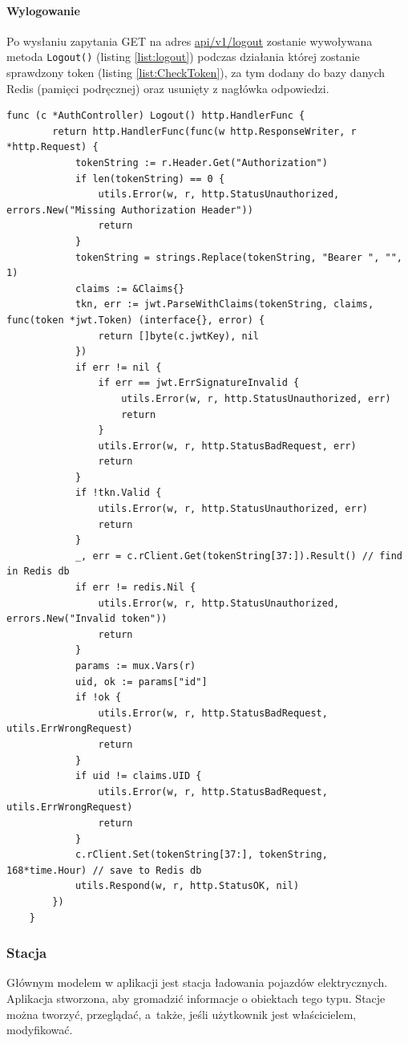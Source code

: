 \paragraph{Wylogowanie\newline}
Po wysłaniu zapytania GET na adres \url{api/v1/logout} zostanie wywoływana metoda \texttt{Logout()} (listing \ref{list:logout}) podczas działania której zostanie sprawdzony token (listing \ref{list:CheckToken}), za tym dodany do bazy danych Redis (pamięci podręcznej) oraz usunięty z nagłówka odpowiedzi.
\begin{lstlisting}[label=list:logout,caption=Wylogowanie,basicstyle=\tiny\ttfamily]
    func (c *AuthController) Logout() http.HandlerFunc {
        return http.HandlerFunc(func(w http.ResponseWriter, r *http.Request) {
            tokenString := r.Header.Get("Authorization")
            if len(tokenString) == 0 {
                utils.Error(w, r, http.StatusUnauthorized, errors.New("Missing Authorization Header"))
                return
            }
            tokenString = strings.Replace(tokenString, "Bearer ", "", 1)
            claims := &Claims{}
            tkn, err := jwt.ParseWithClaims(tokenString, claims, func(token *jwt.Token) (interface{}, error) {
                return []byte(c.jwtKey), nil
            })
            if err != nil {
                if err == jwt.ErrSignatureInvalid {
                    utils.Error(w, r, http.StatusUnauthorized, err)
                    return
                }
                utils.Error(w, r, http.StatusBadRequest, err)
                return
            }
            if !tkn.Valid {
                utils.Error(w, r, http.StatusUnauthorized, err)
                return
            }
            _, err = c.rClient.Get(tokenString[37:]).Result() // find in Redis db
            if err != redis.Nil {
                utils.Error(w, r, http.StatusUnauthorized, errors.New("Invalid token"))
                return
            }
            params := mux.Vars(r)
            uid, ok := params["id"]
            if !ok {
                utils.Error(w, r, http.StatusBadRequest, utils.ErrWrongRequest)
                return
            }
            if uid != claims.UID {
                utils.Error(w, r, http.StatusBadRequest, utils.ErrWrongRequest)
                return
            }
            c.rClient.Set(tokenString[37:], tokenString, 168*time.Hour) // save to Redis db
            utils.Respond(w, r, http.StatusOK, nil)
        })
    }
\end{lstlisting}

\subsubsection{Stacja}
Głównym modelem w aplikacji jest stacja ładowania pojazdów elektrycznych. Aplikacja stworzona, aby gromadzić informacje o obiektach tego typu. Stacje można tworzyć, przeglądać, a~także, jeśli użytkownik jest właścicielem, modyfikować.


